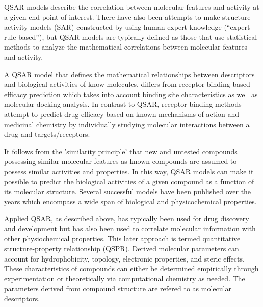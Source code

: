 QSAR models describe the correlation between molecular features and activity at a given end point of interest. There have also been attempts to make structure activity models (SAR) constructed by using human expert knowledge (“expert rule-based”), but QSAR models are typically defined as those that use statistical methods to analyze the mathematical correlations between molecular features and activity. 

A QSAR model that defines the mathematical relationships between descriptors and biological activities of know molecules, differs from receptor binding-based efficacy prediction which takes into account binding site characteristics as well as molecular docking analysis. In contrast to QSAR, receptor-binding methods attempt to predict drug efficacy based on known mechanisms of action and medicinal chemistry by individually studying molecular interactions between a drug and targets/receptors. \cite{Kruhlak2012}

It follows from the 'similarity principle' that new and untested compounds possessing similar molecular features as known compounds are assumed to possess similar activities and properties. In this way, QSAR models can make it possible to predict the biological activities of a given compound as a function of its molecular structure. Several successful models have been published over the years which encompass a wide span of biological and physicochemical properties.

Applied QSAR, as described above, has typically been used for drug discovery and development but has also been used to correlate molecular information with other physiochemical properties. This later approach is termed quantitative structure-property relationship (QSPR). Derived molecular parameters can account for hydrophobicity, topology, electronic properties, and steric effects. These characteristics of compounds can either be determined empirically through experimentation or theoretically via computational chemistry as needed. \cite{Nantasenamat2009} The parameters derived from compound structure are refered to as molecular descriptors.



